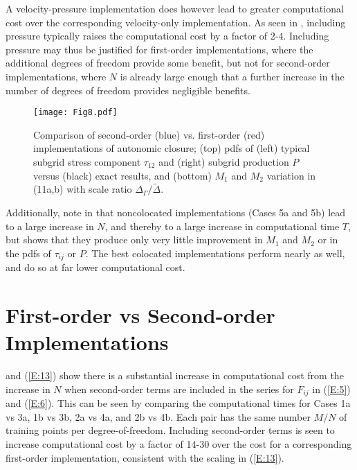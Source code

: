 A velocity-pressure implementation does however lead to greater computational cost over the corresponding velocity-only implementation. As seen in , including pressure typically raises the computational cost by a factor of 2-4. Including pressure may thus be justified for first-order implementations, where the additional degrees of freedom provide some benefit, but not for second-order implementations, where $N$ is already large enough that a further increase in the number of degrees of freedom provides negligible benefits.

%
\begin{figure}
	\begin{center}
	\texttt{[image: Fig8.pdf]}
	\caption{ Comparison of second-order (blue) vs. first-order (red) implementations of autonomic closure; (top) pdfs of (left) typical subgrid stress component $\tau_{12}$ and (right) subgrid production $P$ versus (black) exact results, and (bottom) $M_1$ and $M_2$ variation in (11a,b) with scale ratio $\Delta_{\Gamma}/\widetilde{\Delta}$.}
	\label{F:8}
	\end{center}
\end{figure}
%

Additionally, note in  that noncolocated implementations (Cases 5a and 5b) lead to a large increase in $N$, and thereby to a large increase in computational time $T$, but  shows that they produce only very little improvement in  $M_1$ and $M_2$  or in the pdfs of  $\tau_{ij}$ or $P$. The best colocated implementations perform nearly as well, and do so at far lower computational cost.

\section{First-order vs Second-order Implementations}
\label{sec:IVD}

 and (\ref{E:13}) show there is a substantial increase in computational cost from the increase in $N$ when second-order terms are included in the  series for  $F_{ij}$ in (\ref{E:5}) and (\ref{E:6}). This can be seen by comparing the computational times for Cases 1a vs 3a, 1b vs 3b, 2a vs 4a, and 2b vs 4b. Each pair has the same number  $M/N$ of training points per degree-of-freedom. Including second-order terms is seen to increase computational cost by a factor of 14-30 over the cost for a corresponding first-order implementation, consistent with the scaling in (\ref{E:13}).  


